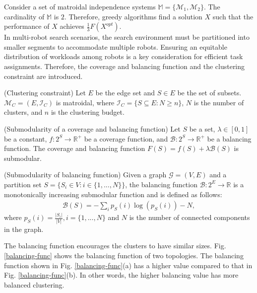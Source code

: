 Consider a set of matroidal independence systems $\mathit{\mathbb{M}} = \{\mathcal{M}_1, \mathcal{M}_2\}$.
The cardinality of $\mathit{\mathbb{M}}$ is $2$.
Therefore, greedy algorithms find a solution $X$ such that the performance of $X$ achieves $\frac{1}{3} F(X^{opt})$.\\

In multi-robot search scenarios, the search environment must be partitioned into smaller segments to accommodate multiple robots.
Ensuring an equitable distribution of workloads among robots is a key consideration for efficient task assignments.
Therefore, the coverage and balancing function \cite{li2024mrsis} and the clustering constraint \cite{liu2013entropy} are introduced. \\

\begin{theorem} \label{thm:clustering-matroid} (Clustering constraint) \cite{liu2013entropy}
Let $E$ be the edge set and $S \in E$ be the set of subsets. $\mathcal{M}_C=(E, \mathcal{I}_C)$ is matroidal, where $\mathcal{I}_C=\{S \subseteq E : N \geq n \}$, $N$ is the number of clusters, and $n$ is the clustering budget. \\
\end{theorem}

\begin{theorem} \label{thm:proposed-obj} (Submodularity of a coverage and balancing function) \cite{li2024mrsis}
Let $S$ be a set, $\lambda \in [0,1]$ be a constant, $f:2^S \rightarrow \mathbb{R}^+$ be a coverage function, and $\mathcal{B}: 2^S \rightarrow \mathbb{R}^+$ be a balancing function.
The coverage and balancing function $F(S)=f(S)+\lambda \mathcal{B}(S)$ is submodular. \\
\end{theorem}

\begin{theorem} \label{thm:balance} (Submodularity of balancing function) \cite{liu2013entropy}
 Given a graph $\mathcal{G}=(V, E)$ and a partition set $S=\{S_i \in V : i\in \{1,...,N\}\}$, the balancing function $\mathcal{B}:2^E \rightarrow \mathbb{R}$ is a monotonically increasing submodular function and is defined as follows:
 \begin{align*}
     \mathcal{B}(S)=-\sum_{i} {p_S(i)\log({p_S(i)})-N},
 \end{align*}
 where $p_S(i)=\frac{|S_i|}{|V|}, i=\{1,...,N\}$ and $N$ is the number of connected components in the graph.

 The balancing function encourages the clusters to have similar sizes. Fig. \ref{balancing-func} shows the balancing function of two topologies. The balancing function shown in Fig. \ref{balancing-func}(a) has a higher value compared to that in Fig. \ref{balancing-func}(b). In other words, the higher balancing value has more balanced clustering.\\
\end{theorem}

